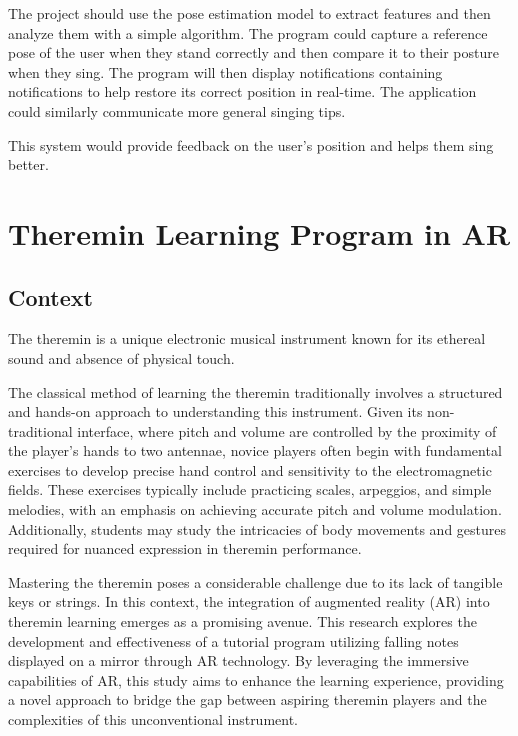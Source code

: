 The project should use the pose estimation model to extract features and then analyze them with a simple algorithm. The program could capture a reference pose of the user when they stand correctly and then compare it to their posture when they sing. The program will then display notifications containing notifications to help restore its correct position in real-time. The application could similarly communicate more general singing tips. 

This system would provide feedback on the user's position and helps them sing better.

\section{Theremin Learning Program in AR}

\subsection{Context}

The theremin is a unique electronic musical instrument known for its ethereal sound and absence of physical touch. 

The classical method of learning the theremin traditionally involves a structured and hands-on approach to understanding this instrument. Given its non-traditional interface, where pitch and volume are controlled by the proximity of the player's hands to two antennae, novice players often begin with fundamental exercises to develop precise hand control and sensitivity to the electromagnetic fields. These exercises typically include practicing scales, arpeggios, and simple melodies, with an emphasis on achieving accurate pitch and volume modulation. Additionally, students may study the intricacies of body movements and gestures required for nuanced expression in theremin performance. 

Mastering the theremin poses a considerable challenge due to its lack of tangible keys or strings. In this context, the integration of augmented reality (AR) into theremin learning emerges as a promising avenue. This research explores the development and effectiveness of a tutorial program utilizing falling notes displayed on a mirror through AR technology. By leveraging the immersive capabilities of AR, this study aims to enhance the learning experience, providing a novel approach to bridge the gap between aspiring theremin players and the complexities of this unconventional instrument.


